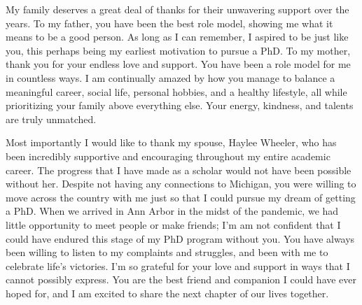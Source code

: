 My family deserves a great deal of thanks for their unwavering support over the years.
To my father, you have been the best role model, showing me what it means to be a good person.
As long as I can remember, I aspired to be just like you, this perhaps being my earliest motivation to pursue a PhD.
To my mother, thank you for your endless love and support.
You have been a role model for me in countless ways. 
I am continually amazed by how you manage to balance a meaningful career, social life, personal hobbies, and a healthy lifestyle, all while prioritizing your family above everything else.
Your energy, kindness, and talents are truly unmatched.

Most importantly I would like to thank my spouse, Haylee Wheeler, who has been incredibly supportive and encouraging throughout my entire academic career.
The progress that I have made as a scholar would not have been possible without her.
Despite not having any connections to Michigan, you were willing to move across the country with me just so that I could pursue my dream of getting a PhD.
When we arrived in Ann Arbor in the midst of the pandemic, we had little opportunity to meet people or make friends; I'm am not confident that I could have endured this stage of my PhD program without you.
You have always been willing to listen to my complaints and struggles, and been with me to celebrate life's victories.
I'm so grateful for your love and support in ways that I cannot possibly express.
You are the best friend and companion I could have ever hoped for, and I am excited to share the next chapter of our lives together. 

